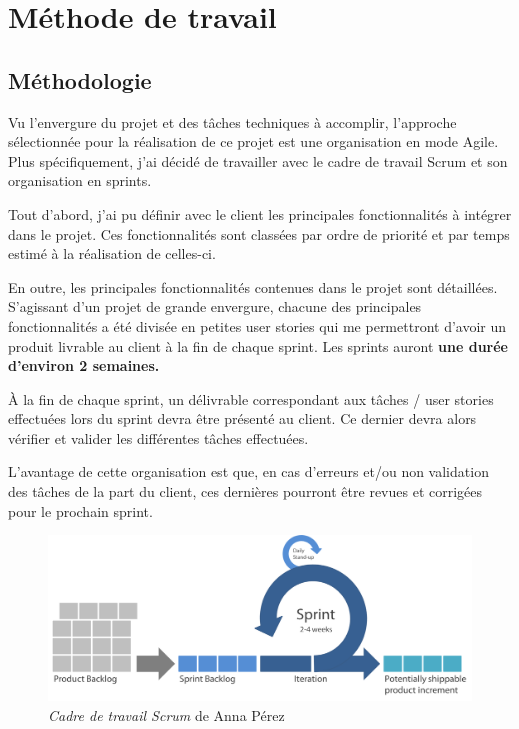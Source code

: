 \section{Méthode de travail}

\subsection{Méthodologie}

Vu l'envergure du projet et des tâches techniques à accomplir, l'approche sélectionnée pour la réalisation de ce projet est une organisation en mode Agile.
Plus spécifiquement, j'ai décidé de travailler avec le cadre de travail Scrum et son organisation en sprints.

Tout d'abord, j'ai pu définir avec le client les principales fonctionnalités à intégrer dans le projet. Ces fonctionnalités sont classées par ordre de priorité et par temps estimé à la réalisation de celles-ci.

En outre, les principales fonctionnalités contenues dans le projet sont détaillées. S'agissant d'un projet de grande envergure, chacune des principales fonctionnalités a été divisée en petites user stories qui me permettront d'avoir un produit livrable au client à la fin de chaque sprint. Les sprints auront \textbf{une durée d’environ 2 semaines.}

À la fin de chaque sprint, un délivrable correspondant aux tâches / user stories effectuées lors du sprint devra être présenté au client. Ce dernier devra alors vérifier et valider les différentes tâches effectuées.

L'avantage de cette organisation est que, en cas d'erreurs et/ou non validation des tâches de la part du client, ces dernières pourront être revues et corrigées pour le prochain sprint.

\begin{figure}[H]
  \centering
  \includegraphics[width=0.75\linewidth]{img/agile.png}
  \caption{ \textit{Cadre de travail Scrum} de Anna Pérez}
  \label{agile}
\end{figure}

